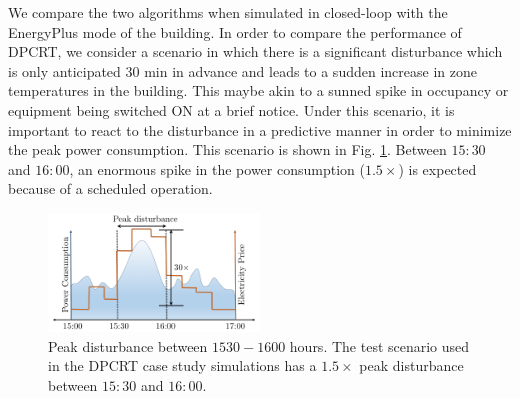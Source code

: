 We compare the two algorithms when simulated in closed-loop with the EnergyPlus mode of the building. In order to compare the performance of DPCRT, we consider a scenario in which there is a significant disturbance which is only anticipated $30$ min in advance and leads to a sudden increase in zone temperatures in the building. This maybe akin to a sunned spike in occupancy or equipment being switched ON at a brief notice. Under this scenario, it is important to react to the disturbance in a predictive manner in order to minimize the peak power consumption. This scenario is shown in Fig. \ref{F:scenario}. Between $15:30$ and $16:00$, an enormous spike in the power consumption ($1.5\times$) is expected because of a scheduled operation.
\begin{figure}
	\centering
	\hspace{1pt}
	\includegraphics[width=0.5\textwidth]{figs/peakpowerplot.pdf}
	\centering
	\caption{Peak disturbance between $1530-1600$ hours. The test scenario used in the DPCRT case study simulations has a $1.5\times$ peak disturbance between $15:30$ and $16:00$.}
	\label{F:scenario}
	\vspace{-10pt}
\end{figure}
